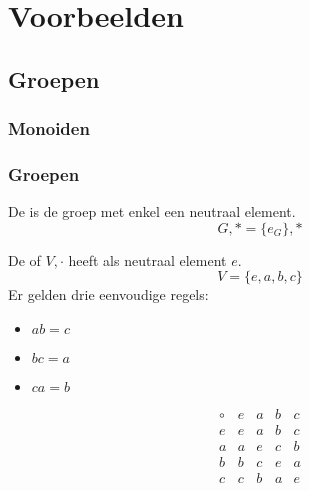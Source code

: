 \documentclass[main.tex]{subfiles}
\begin{document}
\chapter{Voorbeelden}
\label{cha:voorbeelden}

\section{Groepen}

\subsection{Monoiden}



\subsection{Groepen}

\begin{de}
  De  is de groep met enkel een neutraal element.
  \[ G,* = \{ e_{G} \},* \]
\commj {}
\end{de}

\begin{de}
  De  of  $V,\cdot$ heeft als neutraal element $e$.
  \[ V = \{ e, a, b, c \} \]
  Er gelden drie eenvoudige regels: 
  \begin{itemize}
  \item $ab = c$
  \item $bc = a$
  \item $ca = b$
  \end{itemize}
  \[
  \begin{array}{c|cccc}
    \circ & e & a & b & c \\
    \hline
    e & e & a & b & c \\
    a & a & e & c & b \\
    b & b & c & e & a \\
    c & c & b & a & e \\
  \end{array}
  \]
\commj \cycln
\end{de}
\end{document}
